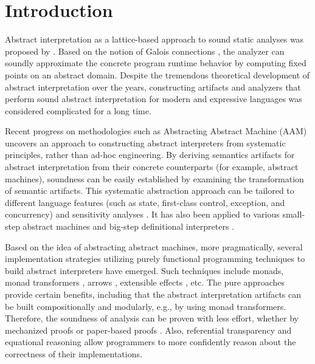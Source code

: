 \section{Introduction} \label{intro}

Abstract interpretation as a lattice-based approach to sound static analyses was
proposed by \citet{DBLP:conf/popl/CousotC77}. Based on the notion of Galois
connections \cite{CousotCousot79-1}, the analyzer can soundly approximate the
concrete program runtime behavior by computing fixed points on an abstract
domain. Despite the tremendous theoretical development of abstract
interpretation over the years, constructing artifacts and analyzers that perform
sound abstract interpretation for modern and expressive languages was considered
complicated for a long time.

Recent progress on methodologies such as Abstracting Abstract
Machine (AAM) \cite{DBLP:journals/jfp/HornM12, DBLP:conf/icfp/HornM10}
uncovers an approach to constructing abstract interpreters from
systematic principles, rather than ad-hoc engineering.  By deriving
semantics artifacts for abstract interpretation from their concrete
counterparts (for example, abstract machines), soundness can be
easily established by examining the transformation of semantic
artifacts.
This systematic abstraction approach can be tailored to different
language features (such as state, first-class control, exception, and
concurrency) and sensitivity analyses \cite{DBLP:conf/icfp/Gilray0M16,
  DBLP:conf/popl/GilrayL0MH16, Darais:2015:GTM:2814270.2814308}. It
has also been applied to various small-step abstract machines
\cite{DBLP:journals/jfp/HornM12, DBLP:conf/icfp/HornM10,
  Sergey:2013:MAI:2491956.2491979} and big-step definitional
interpreters \cite{Wei:2018:RAA:3243631.3236800,
  DBLP:journals/pacmpl/DaraisLNH17, Keidel:2018:CSP:3243631.3236767}.

Based on the idea of abstracting abstract machines, more
pragmatically, several implementation strategies utilizing purely
functional programming techniques to build abstract interpreters have
emerged. Such techniques include monads, monad transformers
\cite{DBLP:journals/pacmpl/DaraisLNH17,
  Sergey:2013:MAI:2491956.2491979}, arrows
\cite{Keidel:2018:CSP:3243631.3236767}, extensible effects
\cite{Githubsemantic}, etc. The pure approaches provide certain
benefits, including that the abstract interpretation artifacts can be
built compositionally and modularly, e.g., by using monad
transformers. Therefore, the soundness of analysis can be proven with
less effort, whether by mechanized proofs
\cite{Darais:2016:CGC:2951913.2951934} or paper-based proofs
\cite{Keidel:2018:CSP:3243631.3236767}.  Also, referential
transparency and equational reasoning allow programmers to more
confidently reason about the correctness of their implementations.

